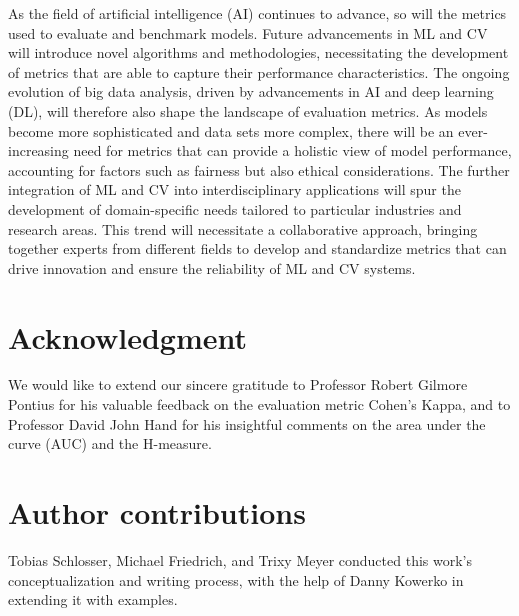 \documentclass{article}
\begin{document}
As the field of artificial intelligence (AI) continues to advance, so will the metrics used to evaluate and benchmark models. Future advancements in ML and CV will introduce novel algorithms and methodologies, necessitating the development of metrics that are able to capture their performance characteristics. The ongoing evolution of big data analysis, driven by advancements in AI and deep learning (DL), will therefore also shape the landscape of evaluation metrics. As models become more sophisticated and data sets more complex, there will be an ever-increasing need for metrics that can provide a holistic view of model performance, accounting for factors such as fairness but also ethical considerations. The further integration of ML and CV into interdisciplinary applications will spur the development of domain-specific needs tailored to particular industries and research areas. This trend will necessitate a collaborative approach, bringing together experts from different fields to develop and standardize metrics that can drive innovation and ensure the reliability of ML and CV systems.




\clearpage




\section*{Acknowledgment}

We would like to extend our sincere gratitude to Professor Robert Gilmore Pontius for his valuable feedback on the evaluation metric Cohen's Kappa, and to Professor David John Hand for his insightful comments on the area under the curve (AUC) and the H-measure.


\section*{Author contributions}

Tobias Schlosser, Michael Friedrich, and Trixy Meyer conducted this work's conceptualization and writing process, with the help of Danny Kowerko in extending it with examples.




\clearpage






\end{document}
